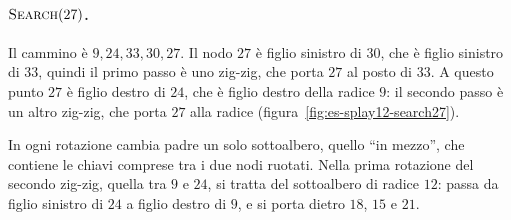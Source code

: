 \paragraph{$\textsc{Search}(27)$.}
Il cammino è $9, 24, 33, 30, 27$. Il nodo $27$ è figlio sinistro di $30$, che è figlio sinistro di $33$, quindi il primo passo è uno zig-zig, che porta $27$ al posto di $33$. A questo punto $27$ è figlio destro di $24$, che è figlio destro della radice $9$: il secondo passo è un altro zig-zig, che porta $27$ alla radice (figura~\ref{fig:es-splay12-search27}).

In ogni rotazione cambia padre un solo sottoalbero, quello ``in mezzo'', che contiene le chiavi comprese tra i due nodi ruotati. Nella prima rotazione del secondo zig-zig, quella tra $9$ e $24$, si tratta del sottoalbero di radice $12$: passa da figlio sinistro di $24$ a figlio destro di $9$, e si porta dietro $18$, $15$ e $21$.

